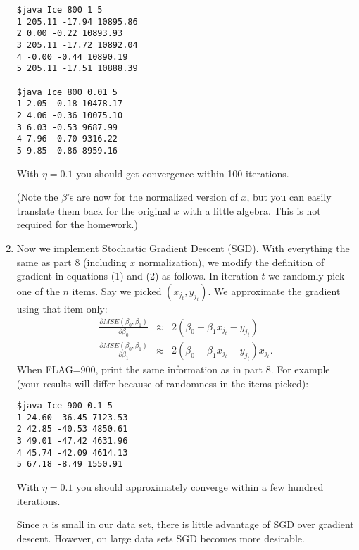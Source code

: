 \documentclass{article}
\begin{document}
\begin{enumerate}
\begin{verbatim}
$java Ice 800 1 5
1 205.11 -17.94 10895.86
2 0.00 -0.22 10893.93
3 205.11 -17.72 10892.04
4 -0.00 -0.44 10890.19
5 205.11 -17.51 10888.39

$java Ice 800 0.01 5
1 2.05 -0.18 10478.17
2 4.06 -0.36 10075.10
3 6.03 -0.53 9687.99
4 7.96 -0.70 9316.22
5 9.85 -0.86 8959.16
\end{verbatim}
With $\eta=0.1$ you should get convergence within 100 iterations.

(Note the $\beta$'s are now for the normalized version of $x$, but you can easily translate them back for the original $x$ with a little algebra.  This is not required for the homework.)

\item
Now we implement Stochastic Gradient Descent (SGD).
With everything the same as part 8 (including $x$ normalization), we modify the definition of gradient in equations (1) and (2) as follows.
In iteration $t$ we randomly pick one of the $n$ items.  Say we picked $(x_{j_t}, y_{j_t})$.
We approximate the gradient using that item only:
\begin{eqnarray}
\frac{\partial MSE(\beta_0, \beta_1)}{\partial \beta_0} &\approx& 2( \beta_0 + \beta_1 x_{j_t} - y_{j_t}) \\
\frac{\partial MSE(\beta_0, \beta_1)}{\partial \beta_1} &\approx& 2 (\beta_0 + \beta_1 x_{j_t} - y_{j_t}) x_{j_t}.
\end{eqnarray}
When FLAG=900, print the same information as in part 8.  For example (your results will differ because of randomness in the items picked):
\begin{verbatim}
$java Ice 900 0.1 5
1 24.60 -36.45 7123.53
2 42.85 -40.53 4850.61
3 49.01 -47.42 4631.96
4 45.74 -42.09 4614.13
5 67.18 -8.49 1550.91
\end{verbatim}
With $\eta=0.1$ you should approximately converge within a few hundred iterations.

Since $n$ is small in our data set, there is little advantage of SGD over gradient descent.  However, on large data sets SGD becomes more desirable.

\end{enumerate}
\end{document}
